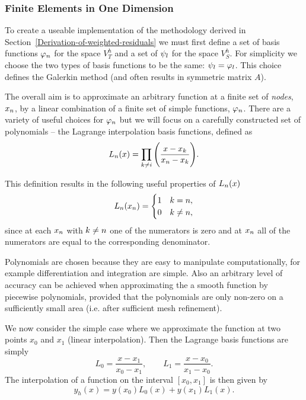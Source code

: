 \subsubsection{Finite Elements in One Dimension}
\label{sub:Actual-Finite-Elements}

To create a useable implementation of the methodology derived in Section~\ref{Derivation-of-weighted-residuals} we must first define a set of basis functions $\varphi_n$ for the space $V_{T}^{h}$ and a set of $\psi_l$ for the space $V_S^h$. For simplicity we choose the two types of basis functions to be the same: $\psi_l = \varphi_l$. This choice defines the Galerkin method (and often results in symmetric matrix $A$).\cite{Zeinkiewicz1967} %


The overall aim is to approximate an arbitrary function at a finite set of \emph{nodes}, $x_n$, by a linear combination of a finite set of simple functions, $\varphi_n$. There are a variety of useful choices for $\varphi_n$ but we will focus on a carefully constructed set of polynomials -- the Lagrange interpolation basis functions, defined as
\begin{equation*}
  L_n(x)=\prod_{k\neq i}\Bigg(\dfrac{x-x_{k}}{x_n-x_{k}}\Bigg).
\end{equation*}

This definition results in the following useful properties of $L_{n}(x)$
\begin{equation}
  \label{eq:35}
  L_{n}(x_{n}) =
  \begin{cases}
    1 & k = n, \\
    0 & k \neq n,
  \end{cases}
\end{equation}
since at each $x_{n}$ with $k \neq n$ one of the numerators is zero and at
$x_{n}$ all of the numerators are equal to the corresponding denominator.

Polynomials are chosen because they are easy to manipulate computationally, for example differentiation and integration are simple. Also an arbitrary level of accuracy can be achieved when approximating the a smooth function by piecewise polynomials, provided that the polynomials are only non-zero on a sufficiently small area (i.e. after sufficient mesh refinement).

We now consider the simple case where we approximate the function at two points
$x_{0}$ and $x_{1}$ (linear interpolation). Then the Lagrange basis
functions are simply
\begin{equation}
  L_{0}=\dfrac{x-x_{1}}{x_{0}-x_{1}},\qquad
  L_{1}=\dfrac{x-x_{0}}{x_{1}-x_{0}}.
  \label{eq:simple_lagrange}
\end{equation}
The interpolation of a function on the interval $[x_{0},x_{1}]$ is then given by
\begin{equation*}
  y_{h}(x)=y(x_{0})L_{0}(x)+y(x_{1})L_{1}(x).
\end{equation*}

